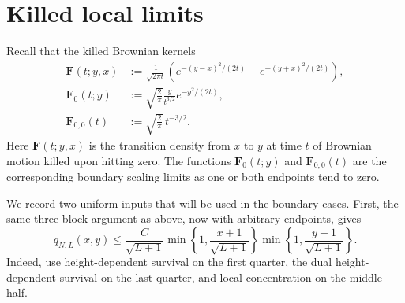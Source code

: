 \documentclass[11pt]{article}
\theoremstyle{plain}
\theoremstyle{definition}
\theoremstyle{remark}
\begin{document}
\section{Killed local limits}
Recall that the killed Brownian kernels 
{
\begin{align*}
 \mathbf F(t;y,x)
 &:=\frac1{\sqrt{2\pi t}}
 \left(
 e^{-(y-x)^2/(2t)}-e^{-(y+x)^2/(2t)}
 \right),\\
 \mathbf F_0(t;y)
 &:=\sqrt{\frac2\pi}\frac{y}{t^{3/2}}
 e^{-y^2/(2t)},\\
 \mathbf F_{0,0}(t)
 &:=\sqrt{\frac2\pi}\,t^{-3/2}.
\end{align*}}
Here \(\mathbf F(t;y,x)\) is the transition density from \(x\) to
\(y\) at time \(t\) of Brownian motion killed upon hitting zero.  The
functions \(\mathbf F_0(t;y)\) and \(\mathbf F_{0,0}(t)\) are the
corresponding boundary scaling limits as one or both endpoints tend to
zero.


We record two uniform inputs that will be used in the boundary cases.
First, the same three-block argument as above, now with arbitrary
endpoints, gives
\begin{equation}
 q_{N,L}(x,y)
 \le \frac{C}{\sqrt{L+1}}
 \min\left\{1,\frac{x+1}{\sqrt{L+1}}\right\}
 \min\left\{1,\frac{y+1}{\sqrt{L+1}}\right\}.
 \label{eq:two-boundary-kernel}
\end{equation}
Indeed, use height-dependent survival on the first quarter, the dual
height-dependent survival on the last quarter, and local concentration
on the middle half. 
\end{document}
